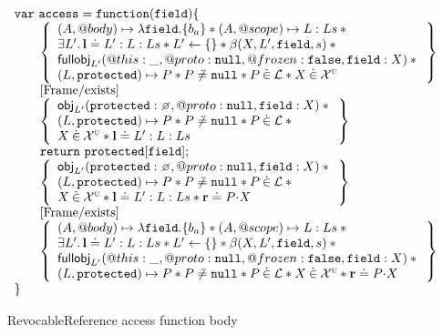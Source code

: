 \documentclass[a4paper]{article}
\begin{document}
\begin{figure}
\[
  \begin{array}{l}
    \jsvar{access = function(field) \{} \\
    \indblock{
      \logic{
        (A, @body) \mapsto \lambda \js{field}.\{b_a\} \sep
          (A, @scope) \mapsto L:Ls \sep {} \\
        \exists L' \st \ls \doteq L' : L : Ls \sep
          L' \bp \{\} \sep \bpGen(X, L', \js{field}, s) \sep {} \\
        \fullobj_{L'}(@this: \_, @proto: \nil, @frozen: \false, \js{field}: X)
          \sep {} \\
        (L, \js{protected}) \mapsto P \sep P \not\doteq \nil \sep P \dotin \loc
          \sep X \dotin \uvars
      } \\
      \step{Frame/exists} \\
      \logic{
        \obj_{L'}(\js{protected}: \none, @proto: \nil, \js{field}: X) \sep {} \\
        (L, \js{protected}) \mapsto P \sep P \not\doteq \nil \sep P \dotin \loc
          \sep {} \\
        X \dotin \uvars \sep \ls \doteq L':L:Ls
      } \\
      \js{return\ protected[field];} \\
      \logic{
        \obj_{L'}(\js{protected}: \none, @proto: \nil, \js{field}: X) \sep {} \\
        (L, \js{protected}) \mapsto P \sep
        P \not\doteq \nil \sep P \dotin \loc \sep {} \\
        X \dotin \uvars \sep \ls \doteq L':L:Ls \sep \rv \doteq \fld{P}{X}
      } \\
      \step{Frame/exists} \\
      \logic{
        (A, @body) \mapsto \lambda \js{field}.\{b_a\} \sep
          (A, @scope) \mapsto L:Ls \sep {} \\
        \exists L' \st \ls \doteq L' : L : Ls \sep
          L' \bp \{\} \sep \bpGen(X, L', \js{field}, s) \sep {} \\
        \fullobj_{L'}(@this: \_, @proto: \nil, @frozen: \false, \js{field}: X)
          \sep {} \\
        (L, \js{protected}) \mapsto P \sep P \not\doteq \nil \sep P \dotin \loc
          \sep X \dotin \uvars \sep \rv \doteq \fld{P}{X}
      }
    }
    \js{\}}
  \end{array}
\]
\caption{RevocableReference access function body}
\label{rr-access}
\end{figure}
\end{document}
